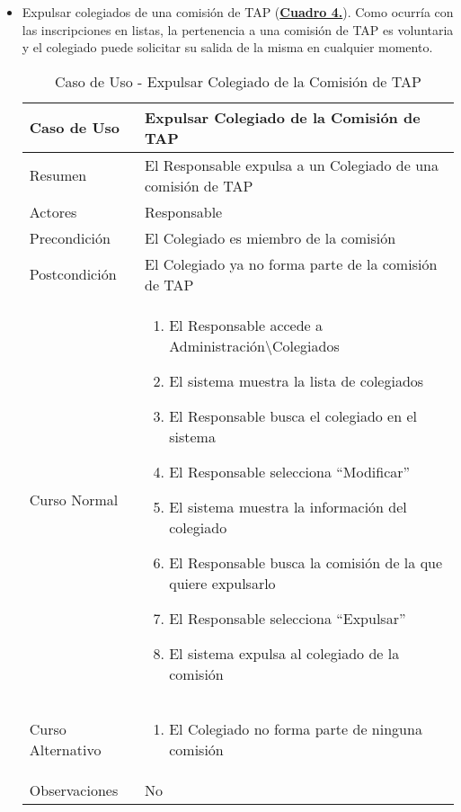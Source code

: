 \begin{itemize}
  \newpage~
	\item \addtocounter{tabla}{1} Expulsar colegiados de una comisión de TAP (\textbf{\hyperref[tab:curExpulsarColegComisionTAP]{Cuadro 4.}}). Como ocurría con las inscripciones en listas, la pertenencia a una comisión de TAP es voluntaria y el colegiado puede solicitar su salida de la misma en cualquier momento.
		\begin{table}[!htbp]
		  \centering  \addtocounter{casouso}{1}
		  \begin{tabular}{|l | p{100mm}|}
		    \textbf{Caso de Uso}  & \textbf{Expulsar Colegiado de la Comisión de TAP} \\ \hline
		    Resumen 		 & El Responsable expulsa a un Colegiado de una comisión de TAP \\ \hline
		    Actores  		 & Responsable \\ \hline
		    Precondición  	 & El Colegiado es miembro de la comisión  \\ \hline
		    Postcondición  	 & El Colegiado ya no forma parte de la comisión de TAP \\ \hline
		    Curso Normal   	 & \begin{enumerate}
		    \item El Responsable accede a Administración\textbackslash Colegiados
			  \item El sistema muestra la lista de colegiados
			  \item El Responsable busca el colegiado en el sistema
			  \item El Responsable selecciona ``Modificar''
			  \item El sistema muestra la información del colegiado
			  \item El Responsable busca la comisión de la que quiere expulsarlo
			  \item El Responsable selecciona ``Expulsar''
			  \item El sistema expulsa al colegiado de la comisión
		    \end{enumerate}  \\ \hline
		    Curso Alternativo  & \begin{enumerate}
			  \item El Colegiado no forma parte de ninguna comisión
		    \end{enumerate}  \\ \hline
		    Observaciones 	 & No  \\ \hline
		  \end{tabular}
		  \caption{Caso de Uso  - Expulsar Colegiado de la Comisión de TAP}
		  \label{tab:curExpulsarColegComisionTAP}
		\end{table}
		\FloatBarrier 
  

\end{itemize}
